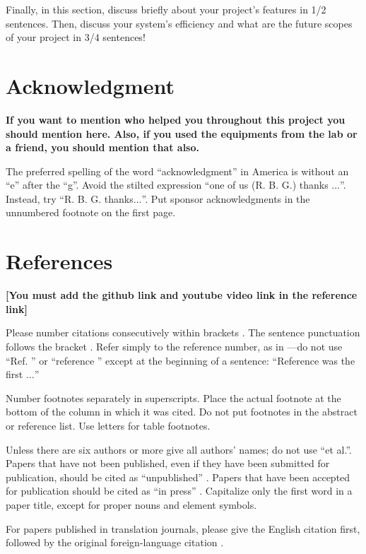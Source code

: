 \documentclass[conference]{IEEEtran}
\begin{document}
Finally, in this section, discuss briefly about your project's features in 1/2 sentences. Then, discuss your system's efficiency and what are the future scopes of your project in 3/4 sentences!

\section*{Acknowledgment}

\textbf{If you want to mention who helped you throughout this project you should mention here. Also, if you used the equipments from the lab or a friend, you should mention that also.}


\noindent The preferred spelling of the word ``acknowledgment'' in America is without 
an ``e'' after the ``g''. Avoid the stilted expression ``one of us (R. B. 
G.) thanks $\ldots$''. Instead, try ``R. B. G. thanks$\ldots$''. Put sponsor 
acknowledgments in the unnumbered footnote on the first page.

\section*{References}

\textbf{[You must add the github link and youtube video link in the reference link]}

\noindent Please number citations consecutively within brackets \cite{b1}. The 
sentence punctuation follows the bracket \cite{b2}. Refer simply to the reference 
number, as in \cite{b3}---do not use ``Ref. \cite{b3}'' or ``reference \cite{b3}'' except at 
the beginning of a sentence: ``Reference \cite{b3} was the first $\ldots$''

Number footnotes separately in superscripts. Place the actual footnote at 
the bottom of the column in which it was cited. Do not put footnotes in the 
abstract or reference list. Use letters for table footnotes.

Unless there are six authors or more give all authors' names; do not use 
``et al.''. Papers that have not been published, even if they have been 
submitted for publication, should be cited as ``unpublished'' \cite{b4}. Papers 
that have been accepted for publication should be cited as ``in press'' \cite{b5}. 
Capitalize only the first word in a paper title, except for proper nouns and 
element symbols.

For papers published in translation journals, please give the English 
citation first, followed by the original foreign-language citation \cite{b6}.
\end{document}
